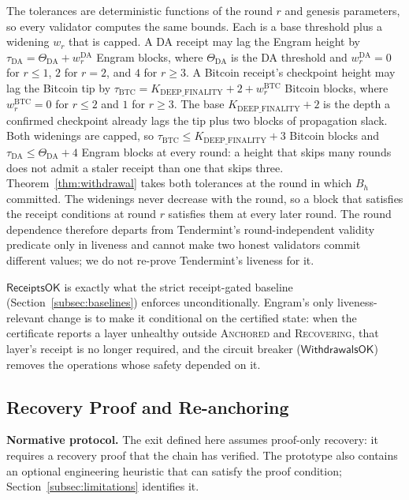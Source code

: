 The tolerances are deterministic functions of the round $r$ and genesis
parameters, so every validator computes the same bounds. Each is a base
threshold plus a widening $w_r$ that is capped. A DA receipt may lag the Engram height by
$\tau_{\text{DA}} = \Theta_{\text{DA}} + w^{\text{DA}}_r$ Engram blocks, where
$\Theta_{\text{DA}}$ is the DA threshold and $w^{\text{DA}}_r = 0$ for
$r \le 1$, $2$ for $r = 2$, and $4$ for $r \ge 3$. A Bitcoin receipt's
checkpoint height may lag the Bitcoin tip by
$\tau_{\text{BTC}} = K_{\text{DEEP\_FINALITY}} + 2 + w^{\text{BTC}}_r$ Bitcoin
blocks, where $w^{\text{BTC}}_r = 0$ for $r \le 2$ and $1$ for $r \ge 3$. The
base $K_{\text{DEEP\_FINALITY}} + 2$ is the depth a confirmed checkpoint
already lags the tip plus two blocks of propagation slack. Both widenings are
capped, so $\tau_{\text{BTC}} \le K_{\text{DEEP\_FINALITY}} + 3$ Bitcoin blocks and
$\tau_{\text{DA}} \le \Theta_{\text{DA}} + 4$ Engram blocks at every round: a height
that skips many rounds does not admit a staler receipt than one that skips three.
Theorem~\ref{thm:withdrawal} takes both tolerances at the round in which
$B_h$ committed. The widenings never decrease with the round, so a block that satisfies the receipt conditions at round $r$ satisfies them at every later round. The round dependence therefore departs from Tendermint's round-independent validity predicate only in liveness and cannot make two honest validators commit different values; we do not re-prove Tendermint's liveness for it.

$\mathsf{ReceiptsOK}$ is exactly what the strict receipt-gated baseline
(Section~\ref{subsec:baselines}) enforces unconditionally. Engram's only liveness-relevant change is to make
it conditional on the certified state: when the certificate reports a layer
unhealthy outside \textsc{Anchored} and \textsc{Recovering}, that layer's
receipt is no longer required, and the circuit breaker
($\mathsf{WithdrawalsOK}$) removes the operations whose safety depended on
it.

\subsection{Recovery Proof and Re-anchoring}
\label{subsec:reanchoring}

\textbf{Normative protocol.} The exit defined here assumes proof-only recovery:
it requires a recovery proof that the chain has verified. The prototype also
contains an optional engineering heuristic that can satisfy the proof
condition; Section~\ref{subsec:limitations} identifies it.

